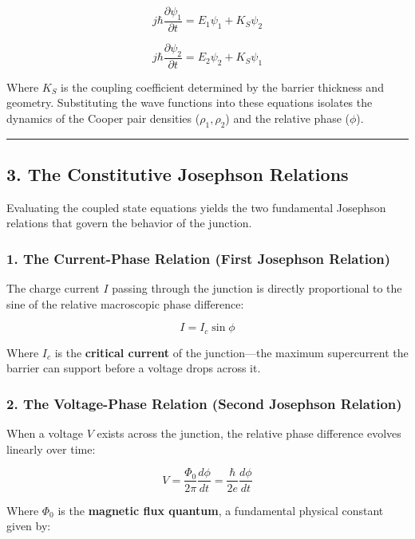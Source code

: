 \documentclass[
]{article}
\begin{document}
\[j\hbar \frac{\partial \psi_1}{\partial t} = E_1 \psi_1 + K_S \psi_2\]

\[j\hbar \frac{\partial \psi_2}{\partial t} = E_2 \psi_2 + K_S \psi_1\]

Where \(K_S\) is the coupling coefficient determined by the barrier
thickness and geometry. Substituting the wave functions into these
equations isolates the dynamics of the Cooper pair densities
(\(\rho_1, \rho_2\)) and the relative phase (\(\phi\)).

\begin{center}\rule{0.5\linewidth}{0.5pt}\end{center}

\subsection{3. The Constitutive Josephson
Relations}\label{the-constitutive-josephson-relations}

Evaluating the coupled state equations yields the two fundamental
Josephson relations that govern the behavior of the junction.

\subsubsection{1. The Current-Phase Relation (First Josephson
Relation)}\label{the-current-phase-relation-first-josephson-relation}

The charge current \(I\) passing through the junction is directly
proportional to the sine of the relative macroscopic phase difference:

\[I = I_c \sin \phi\]

Where \(I_c\) is the \textbf{critical current} of the junction---the
maximum supercurrent the barrier can support before a voltage drops
across it.

\subsubsection{2. The Voltage-Phase Relation (Second Josephson
Relation)}\label{the-voltage-phase-relation-second-josephson-relation}

When a voltage \(V\) exists across the junction, the relative phase
difference evolves linearly over time:

\[V = \frac{\Phi_0}{2\pi} \frac{d\phi}{dt} = \frac{\hbar}{2e} \frac{d\phi}{dt}\]

Where \(\Phi_0\) is the \textbf{magnetic flux quantum}, a fundamental
physical constant given by:
\end{document}
